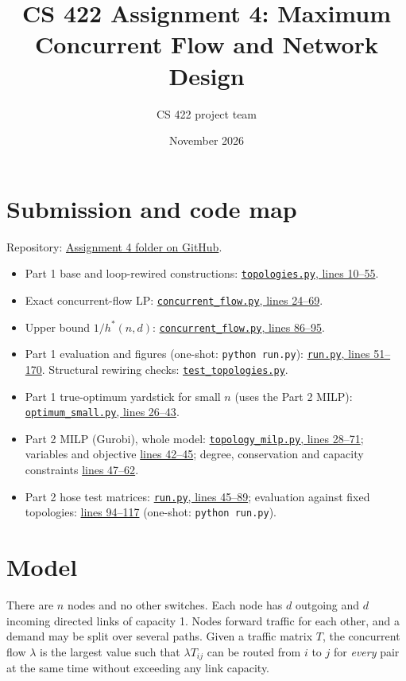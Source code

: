\documentclass[11pt,letterpaper]{article}
\title{CS 422 Assignment 4: Maximum Concurrent Flow and Network Design}
\author{CS 422 project team}
\date{November 2026}
\newcommand{\repo}{https://github.com/RohMalpani/CS422Assignments/blob/main/assignment4}
\begin{document}
\maketitle

\section{Submission and code map}
Repository: \href{https://github.com/RohMalpani/CS422Assignments/tree/main/assignment4}{Assignment 4 folder on GitHub}.
\begin{itemize}
\item Part 1 base and loop-rewired constructions:
\href{\repo/part1/topologies.py\#L10-L55}{\texttt{topologies.py}, lines 10--55}.
\item Exact concurrent-flow LP:
\href{\repo/part1/concurrent_flow.py\#L24-L69}{\texttt{concurrent\_flow.py}, lines 24--69}.
\item Upper bound $1/h^*(n,d)$:
\href{\repo/part1/concurrent_flow.py\#L86-L95}{\texttt{concurrent\_flow.py}, lines 86--95}.
\item Part 1 evaluation and figures (one-shot: \texttt{python run.py}):
\href{\repo/part1/run.py\#L51-L170}{\texttt{run.py}, lines 51--170}.
Structural rewiring checks: \href{\repo/part1/test_topologies.py}{\texttt{test\_topologies.py}}.
\item Part 1 true-optimum yardstick for small $n$ (uses the Part 2 MILP):
\href{\repo/part1/optimum_small.py\#L26-L43}{\texttt{optimum\_small.py}, lines 26--43}.
\item Part 2 MILP (Gurobi), whole model:
\href{\repo/part2/topology_milp.py\#L28-L71}{\texttt{topology\_milp.py}, lines 28--71};
variables and objective
\href{\repo/part2/topology_milp.py\#L42-L45}{lines 42--45};
degree, conservation and capacity constraints
\href{\repo/part2/topology_milp.py\#L47-L62}{lines 47--62}.
\item Part 2 hose test matrices:
\href{\repo/part2/run.py\#L45-L89}{\texttt{run.py}, lines 45--89};
evaluation against fixed topologies:
\href{\repo/part2/run.py\#L94-L117}{lines 94--117}
(one-shot: \texttt{python run.py}).
\end{itemize}

\section{Model}
There are $n$ nodes and no other switches. Each node has $d$ outgoing and $d$
incoming directed links of capacity 1. Nodes forward traffic for each other,
and a demand may be split over several paths. Given a traffic matrix $T$, the
concurrent flow $\lambda$ is the largest value such that $\lambda T_{ij}$ can be
routed from $i$ to $j$ for \emph{every} pair at the same time without exceeding
any link capacity.
\end{document}
